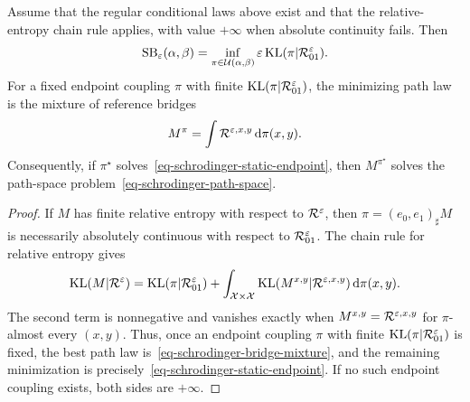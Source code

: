 \begin{prop}\label{prop-schrodinger-endpoint-reduction}
	Assume that the regular conditional laws above exist and that the relative-entropy chain rule applies, with value $+\infty$ when absolute continuity fails. Then
	\begin{equation}\label{eq-schrodinger-static-endpoint}
		\mathrm{SB}_\varepsilon(\alpha,\beta)
		=
		\inf_{\pi\in\mathcal{U}(\alpha,\beta)}
		\varepsilon\operatorname{KL}(\pi|\mathcal{R}^\varepsilon_{01}).
	\end{equation}
	For a fixed endpoint coupling $\pi$ with finite $\operatorname{KL}(\pi|\mathcal{R}^\varepsilon_{01})$, the minimizing path law is the mixture of reference bridges
	\begin{equation}\label{eq-schrodinger-bridge-mixture}
		M^\pi
		=
		\int \mathcal{R}^{\varepsilon,x,y}\,\mathrm{d}\pi(x,y).
	\end{equation}
	Consequently, if $\pi^\star$ solves~\eqref{eq-schrodinger-static-endpoint}, then $M^{\pi^\star}$ solves the path-space problem~\eqref{eq-schrodinger-path-space}.
\end{prop}

\begin{proof}
	If $M$ has finite relative entropy with respect to $\mathcal{R}^\varepsilon$, then $\pi=(e_0,e_1)_\sharp M$ is necessarily absolutely continuous with respect to $\mathcal{R}^\varepsilon_{01}$. The chain rule for relative entropy gives
	\begin{equation}\label{eq-kl-chain-rule-path}
		\operatorname{KL}(M|\mathcal{R}^\varepsilon)
		=
		\operatorname{KL}(\pi|\mathcal{R}^\varepsilon_{01})
		+
		\int_{\mathcal{X}\times\mathcal{X}}
			\operatorname{KL}(M^{x,y}|\mathcal{R}^{\varepsilon,x,y})
			\,\mathrm{d}\pi(x,y).
	\end{equation}
	The second term is nonnegative and vanishes exactly when $M^{x,y}=\mathcal{R}^{\varepsilon,x,y}$ for $\pi$-almost every $(x,y)$. Thus, once an endpoint coupling $\pi$ with finite $\operatorname{KL}(\pi|\mathcal{R}^\varepsilon_{01})$ is fixed, the best path law is~\eqref{eq-schrodinger-bridge-mixture}, and the remaining minimization is precisely~\eqref{eq-schrodinger-static-endpoint}. If no such endpoint coupling exists, both sides are $+\infty$.
\end{proof}

